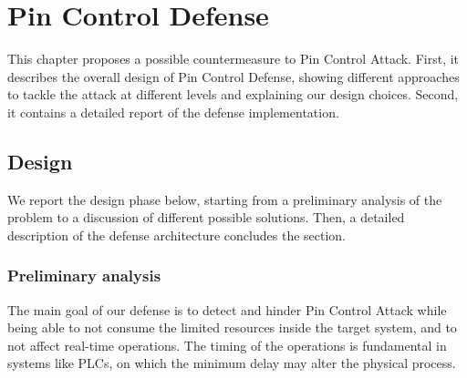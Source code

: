 \chapter{Pin Control Defense}
\label{chap:defense}

This chapter proposes a possible countermeasure to Pin Control Attack.
First, it describes the overall design of Pin Control Defense, showing different approaches to tackle the attack at different levels
and explaining our design choices. Second, it contains a detailed report of the defense implementation.


\section{Design}
We report the design phase below, starting from a preliminary analysis of the problem to a discussion of different possible solutions.
Then, a detailed description of the defense architecture concludes the section.


\subsection{Preliminary analysis}
\label{sec:pre-analysis}

The main goal of our defense is to detect and hinder Pin Control Attack while being able to not consume the limited resources inside the target system,
and to not affect real-time operations. The timing of the operations is fundamental in systems like PLCs, on which the minimum delay may alter the physical process.

